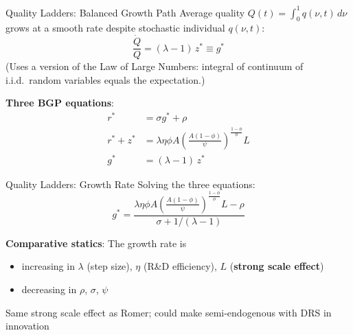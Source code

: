 \documentclass[blue]{beamer}
\begin{document}
		
		\begin{frame}{Quality Ladders: Balanced Growth Path}
		 Average quality $Q(t) = \int_0^1 q(\nu,t)\, d\nu$ grows at a smooth rate despite stochastic individual $q(\nu,t)$:
			\[
			\frac{\dot{Q}}{Q} = (\lambda - 1)\, z^* \equiv g^*
			\]
			(Uses a version of the Law of Large Numbers: integral of continuum of i.i.d.\ random variables equals the expectation.)
			
			\bigskip
			\textbf{Three BGP equations}:
			\begin{align*}
				r^* &= \sigma g^* + \rho \\
				r^* + z^* &= \lambda\eta\phi A\!\left(\frac{A(1-\phi)}{\psi}\right)^{\!\frac{1-\phi}{\phi}} L \\
				g^* &= (\lambda - 1)\, z^*
			\end{align*}
		\end{frame}
		\begin{frame}{Quality Ladders: Growth Rate}
			Solving the three equations:
			\[
			{g^* = \frac{\lambda\eta\phi A\!\left(\frac{A(1-\phi)}{\psi}\right)^{\!\frac{1-\phi}{\phi}} L - \rho}{\sigma + 1/(\lambda - 1)}} 
			\]
			
			\textbf{Comparative statics}: The growth rate is
			\begin{itemize}
				\item increasing in $\lambda$ (step size), $\eta$ (R\&D efficiency), $L$ (\textbf{strong scale effect})
				\item decreasing in $\rho$, $\sigma$, $\psi$
			\end{itemize}
			Same strong scale effect as Romer; could make semi-endogenous with DRS in innovation
		\end{frame}
		
\end{document}
